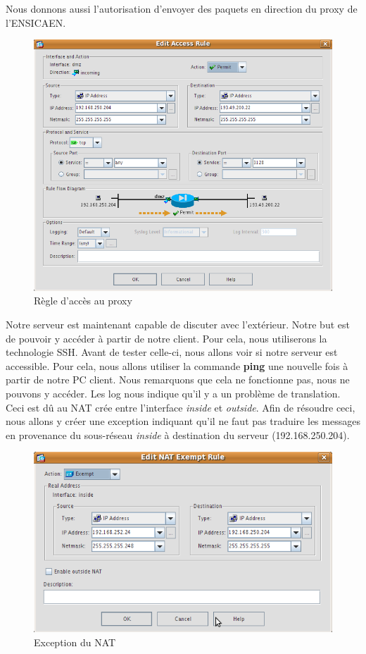 \documentclass[a4paper,12pt]{article}
\begin{document}
Nous donnons aussi l'autorisation d'envoyer des paquets en direction du proxy de l'ENSICAEN.
\begin{figure}[H]
	\center
	\includegraphics[width=12cm]{img/15-policydmzproxy.png}
	\caption{Règle d'accès au proxy}
\end{figure}

Notre serveur est maintenant capable de discuter avec l'extérieur. Notre but est de pouvoir y accéder à partir de notre client. Pour cela, nous utiliserons 
la technologie SSH. Avant de tester celle-ci, nous allons voir si notre serveur est accessible. Pour cela, nous allons utiliser la commande \textbf{ping}
une nouvelle fois à partir de notre PC client. Nous remarquons que cela ne fonctionne pas, nous ne pouvons y accéder. Les log nous indique qu'il y a un problème
de translation. Ceci est dû au NAT crée entre l'interface \textit{inside} et \textit{outside}. Afin de résoudre ceci, nous allons y créer une exception indiquant
qu'il ne faut pas traduire les messages en provenance du sous-réseau \textit{inside} à destination du serveur (192.168.250.204).

\begin{figure}[H]
	\center
	\includegraphics[width=12cm]{img/16-natexception.png}
	\caption{Exception du NAT}
\end{figure}
\end{document}
